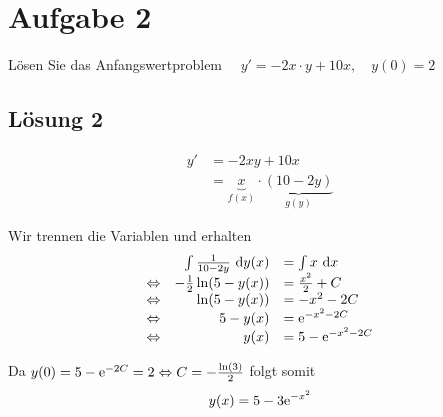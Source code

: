 \documentclass[main.tex]{subfiles}
\begin{document}
\section{Aufgabe 2}
Lösen Sie das Anfangswertproblem $\quad y' = -2x \cdot y + 10x, \quad  y(0) = 2$

\subsection{Lösung 2}
\begin{align*}
    y' &= -2xy + 10x \\
    &= \underbrace{x}_{f(x)}\cdot \underbrace{(10-2y)}_{g(y)}
\end{align*}

Wir trennen die Variablen und erhalten
\begin{equation*}
    \begin{array}{lrl}
        & \int \frac{1}{10-2y} ~\mathrm{d}y(x) &= \int x ~\mathrm{d}x \\
        \Leftrightarrow & -\frac{1}{2} \ln (5 - y(x)) &= \frac{x^2}{2} + C \\
        \Leftrightarrow & \ln (5 - y(x))  &= -x^2 - 2C \\
        \Leftrightarrow & 5 - y(x)  &= \mathrm{e}^{-x^2 - 2C} \\
        \Leftrightarrow & y(x)  &= 5 - \mathrm{e}^{-x^2 - 2C} \\
    \end{array}
\end{equation*}

Da $y(0) = 5-\mathrm{e}^{-2C} = 2 \Leftrightarrow C = -\frac{\ln(3)}{2}$ folgt somit
$$
    y(x) = 5 - 3\mathrm{e}^{- x^2}
$$
\end{document}
